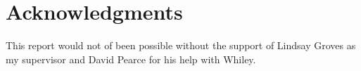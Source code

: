 \chapter*{Acknowledgments}\label{C:ack}


This report would not of been possible without the support of Lindsay Groves as my supervisor and David Pearce for his help with Whiley.

